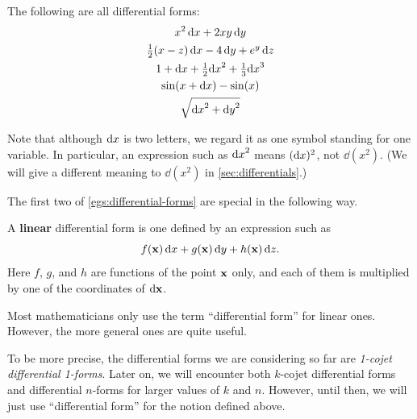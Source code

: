 \begin{egs}\label{egs:differential-forms}
  The following are all differential forms:
  \begin{gather*}
    x^2 \,{\mathrm{d} x} + 2xy \, {\mathrm{d} y}\\
    \textstyle\frac{1}{2}({x-z}) \,{\mathrm{d} x} - 4\, {\mathrm{d} y} + e^y \,{\mathrm{d} z}\\
    1 + {\mathrm{d} x} + \textstyle\frac{1}{2} {\mathrm{d} x}^2 + \textstyle\frac{1}{3} {\mathrm{d} x}^3\\
    \sin(x + {\mathrm{d} x}) - \sin(x)\\
    \sqrt{{\mathrm{d} x}^2+{\mathrm{d} y}^2}
  \end{gather*}
\end{egs}

Note that although ${\mathrm{d} x}$ is two letters, we regard it as one symbol standing for one variable.
In particular, an expression such as ${\mathrm{d} x}^2$ means $({\mathrm{d} x})^2$, not $\dd(x^2)$.
(We will give a different meaning to $\dd(x^2)$ in \cref{sec:differentials}.)

The first two of \cref{egs:differential-forms} are special in the following way.

\begin{defn}
  A \textbf{linear} differential form is one defined by an expression such as
  \[ f(\mathbf{x}) \, {\mathrm{d} x} + g(\mathbf{x}) \, {\mathrm{d} y} + h(\mathbf{x}) \, {\mathrm{d} z}. \]
  Here $f$, $g$, and $h$ are functions of the point $\mathbf{x}$ only, and each of them is multiplied by one of the coordinates of ${\mathrm{d} \mathbf{x}}$.
\end{defn}

Most mathematicians only use the term ``differential form'' for linear ones.
However, the more general ones are quite useful.

\begin{adv}
  To be more precise, the differential forms we are considering so far are \emph{1-cojet differential 1-forms}.
  Later on, we will encounter both $k$-cojet differential forms and differential $n$-forms for larger values of $k$ and $n$.
  However, until then, we will just use ``differential form'' for the notion defined above.
\end{adv}

